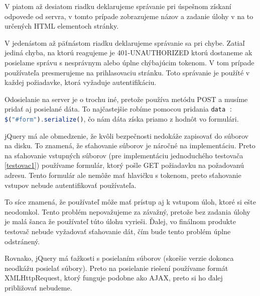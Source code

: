 V piatom až desiatom riadku deklarujeme správanie pri úspešnom získaní odpovede
od servra, v tomto prípade zobrazujeme názov a zadanie úlohy v na to určených
HTML elementoch stránky.

V jedenástom až päťnástom riadku deklarujeme správanie sa pri chybe. Zatiaľ jediná
chyba, na ktorú reagujeme je 401-UNAUTHORIZED ktorú dostaneme ak posielame
správu s nesprávnym alebo úplne chýbajúcim tokenom. V tom prípade používateľa presmerujeme
na prihlasovaciu stránku. Toto správanie je použíté v každej požiadavke, ktorá
vyžaduje autentifikáciu.

Odosielanie na server je o trochu iné, pretože používa metódu POST a musíme pridať
aj posielané dáta. To najčastejšie robíme pomocou pridania \newline
\lstinline[language=Javascript]{data : $("#form").serialize()}, čo nám dáta
získa priamo z hodnôt vo formulári.

jQuery má ale obmedzenie, že kvôli bezpečnosti nedokáže zapisovať do súborov na disku.
To znamená, že sťahovanie súborov je náročné na implementáciu. Preto na sťahovanie
vstupných súborov (pre implementáciu jednoduchého testovača \ref{testovac1}) používame
formulár, ktorý pošle GET požiadavku na požadovanú adresu. Tento formulár ale nemôže mať
hlavičku s tokenom, preto sťahovanie vstupov nebude autentifikovať používateľa.

To síce znamená, že používateľ môže mať prístup aj k vstupom úloh, ktoré si ešte neodomkol.
Tento problém nepovažujeme za závažný, pretože bez zadania úlohy je malá šanca že používateľ
túto úlohu vyrieši. Ďalej, vo finálnom produkte testovač nebude vyžadovať sťahovanie
dát, čím bude tento problém úplne odstránený.

Rovnako, jQuery má ťažkosti s posielaním súborov (skoršie verzie dokonca neodkážu
posielať súbory). Preto na posielanie riešení používame formát XMLHttpRequest, ktorý
funguje podobne ako AJAX, preto si ho ďalej približovať nebudeme.
